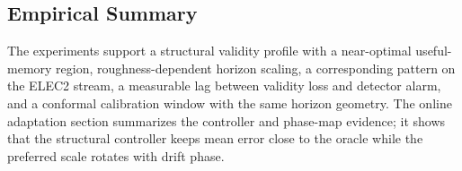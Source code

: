 \subsection{Empirical Summary}\label{sec:empirical_summary}

The experiments support a structural validity profile with a near-optimal
useful-memory region, roughness-dependent horizon scaling, a corresponding
pattern on the ELEC2 stream, a measurable lag between validity loss and detector
alarm, and a conformal calibration window with the same horizon geometry. The
online adaptation section summarizes the controller and phase-map evidence; it
shows that the structural controller keeps mean error close to the oracle while
the preferred scale rotates with drift phase.
